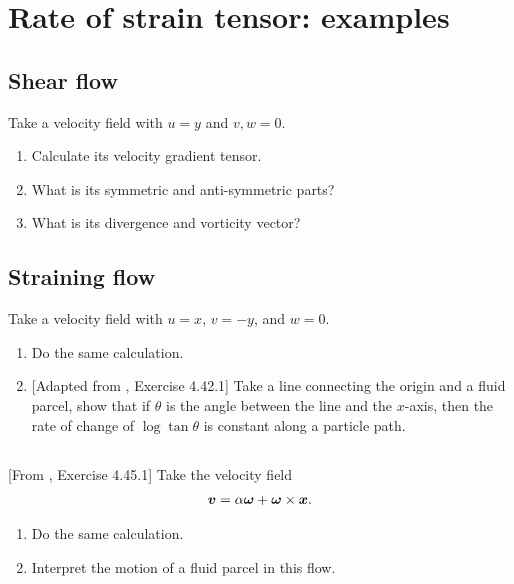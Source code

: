 \documentclass[11pt,letterpaper]{article}
\begin{document}
\section{Rate of strain tensor: examples}
\subsection{Shear flow}
Take a velocity field with $u=y$ and $v,w=0$. 
\begin{enumerate}
    \item Calculate its velocity gradient tensor.
    \item What is its symmetric and anti-symmetric parts?
    \item What is its divergence and vorticity vector? 
\end{enumerate}

\subsection{Straining flow}
Take a velocity field with $u=x$, $v=-y$, and $w=0$. 
\begin{enumerate}
    \item Do the same calculation.
    \item {[Adapted from \cite{Aris_62}, Exercise 4.42.1]} Take a line connecting the origin and a fluid parcel, show that if $\theta$ is the angle between the line and the $x$-axis, then the rate of change of $\log\tan\theta$ is constant along a particle path. 
\end{enumerate}

\subsection{}
[From \cite{Aris_62}, Exercise 4.45.1] Take the velocity field
\begin{align}
    \boldsymbol{v} = \alpha\boldsymbol{\omega} + \boldsymbol{\omega} \times \boldsymbol{x}.
\end{align}
\begin{enumerate}
    \item Do the same calculation.
    \item Interpret the motion of a fluid parcel in this flow.
\end{enumerate}
\end{document}
